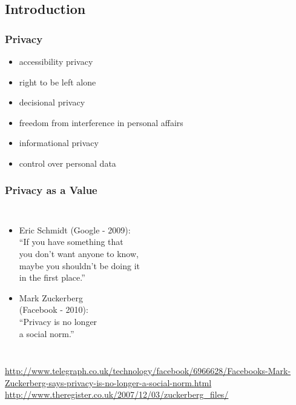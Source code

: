 \documentclass[dvipsnames]{beamer}
\theoremstyle{plain}
\begin{document}
\subsection{Introduction}

\begin{frame}
  \frametitle{Privacy}

  \begin{itemize}
    \item accessibility privacy
    \item right to be left alone

    \pause
    \bigskip
    \item decisional privacy
    \item freedom from interference in personal affairs

    \pause
    \bigskip
    \item informational privacy
    \item control over personal data
  \end{itemize}
\end{frame}

\begin{frame}
  \frametitle{Privacy as a Value}

  \begin{columns}

    \begin{itemize}
      \item Eric Schmidt (Google - 2009):\\
        \smallskip
        ``If you have something that\\
          you don't want anyone to know,\\
          maybe you shouldn't be doing it\\
          in the first place.''

      \pause
      \medskip
      \item Mark Zuckerberg\\
        (Facebook - 2010):\\
        \smallskip
        ``Privacy is no longer\\
          a social norm.''
    \end{itemize}
  \end{columns}

  \medskip
  \tiny{\url{http://www.telegraph.co.uk/technology/facebook/6966628/Facebooks-Mark-Zuckerberg-says-privacy-is-no-longer-a-social-norm.html}}\\
  \tiny{\url{http://www.theregister.co.uk/2007/12/03/zuckerberg_files/}}\\
\end{frame}
\end{document}
